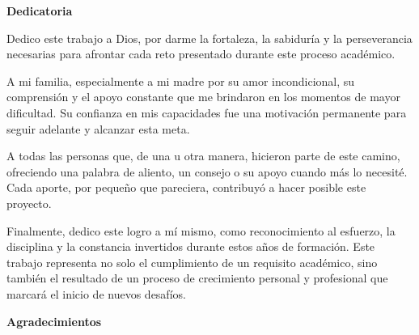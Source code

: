 
\normalsize


\noindent \begin{center}
\textbf{Dedicatoria}
\par\end{center}

 \vspace{0.7mm}
 
 \begin{center}
    Dedico este trabajo a Dios, por darme la fortaleza, la sabiduría y la perseverancia necesarias para afrontar cada reto presentado durante este proceso académico.
    
    A mi familia, especialmente a mi madre por su amor incondicional, su comprensión y el apoyo constante que me brindaron en los momentos de mayor dificultad. Su confianza en mis capacidades fue una motivación permanente para seguir adelante y alcanzar esta meta.
    
    A todas las personas que, de una u otra manera, hicieron parte de este camino, ofreciendo una palabra de aliento, un consejo o su apoyo cuando más lo necesité. Cada aporte, por pequeño que pareciera, contribuyó a hacer posible este proyecto.
    
    Finalmente, dedico este logro a mí mismo, como reconocimiento al esfuerzo, la disciplina y la constancia invertidos durante estos años de formación. Este trabajo representa no solo el cumplimiento de un requisito académico, sino también el resultado de un proceso de crecimiento personal y profesional que marcará el inicio de nuevos desafíos.
    
 \end{center}


 \vspace{3.0cm}

\noindent \begin{center} 
 \textbf{Agradecimientos}
\par\end{center}

 \vspace{0.7mm}
 
